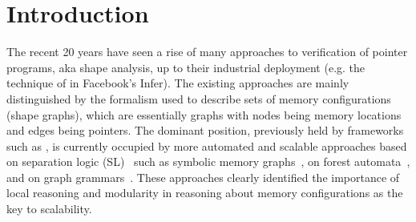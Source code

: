 {\section{Introduction}

%
%
The recent 20 years have seen a rise of many approaches to verification of pointer programs, aka shape analysis, up to their industrial deployment (e.g. the technique of \cite{abduction11} in Facebook's Infer). 
%
The existing approaches are mainly distinguished by the formalism used to describe sets of memory configurations (shape graphs), which are essentially graphs with nodes being memory locations and edges being pointers.
%
The dominant position, previously held by frameworks such as \cite{pale,pale01},
is currently occupied by more automated and scalable approaches based on separation
logic (SL)~\cite{Reynolds:SepLogic:02,InvaderCAV07,sas07:chang_rival_necula} such as symbolic memory
graphs~\cite{dudka13sas}, on forest automata~\cite{forester12}, and on graph
grammars~\cite{Juggrnaut2015}.
These approaches clearly identified the importance of local reasoning and modularity in reasoning about memory configurations as the key to scalability.

}
